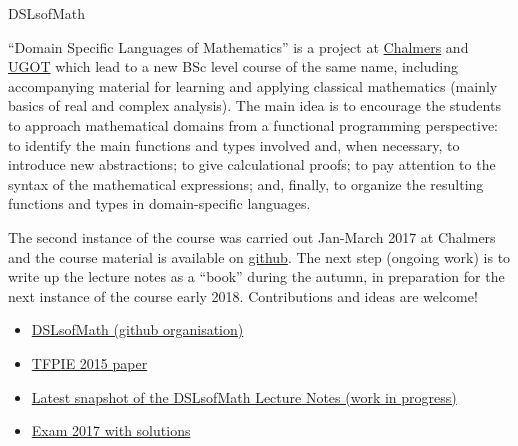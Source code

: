 \documentclass[DIV16,twocolumn,10pt]{scrreprt}
\begin{document}
\begin{hcarentry}{DSLsofMath}
\makeheader

``Domain Specific Languages of Mathematics'' is a project at
\href{http://www.chalmers.se/en/Pages/default.aspx}{Chalmers} and
\href{http://www.gu.se/english}{UGOT} which lead to a new BSc level
course of the same name, including accompanying material for learning
and applying classical mathematics (mainly basics of real and complex
analysis).
%
The main idea is to encourage the students to approach mathematical
domains from a functional programming perspective:
%
to identify the main functions and types involved and, when necessary,
to introduce new abstractions;
%
to give calculational proofs;
%
to pay attention to the syntax of the mathematical expressions;
%
and, finally, to organize the resulting functions and types in
domain-specific languages.

The second instance of the course was carried out Jan-March 2017 at
Chalmers and the course material is available on
\href{https://github.com/DSLsofMath/DSLsofMath}{github}.
%
The next step (ongoing work) is to write up the lecture notes as a
``book'' during the autumn, in preparation for the next instance of
the course early 2018.
%
Contributions and ideas are welcome!

\FurtherReading
\begin{itemize}
\item \href{https://github.com/DSLsofMath}{DSLsofMath (github organisation)}
\item \href{https://github.com/DSLsofMath/tfpie2015}{TFPIE 2015 paper}
\item \href{https://github.com/DSLsofMath/DSLsofMath/tree/master/L/snapshots}{Latest snapshot of the DSLsofMath Lecture Notes (work in progress)}
\item \href{https://github.com/DSLsofMath/DSLsofMath/blob/master/Exam/2017-03/}{Exam 2017 with solutions}
\end{itemize}
\end{hcarentry}
\end{document}
